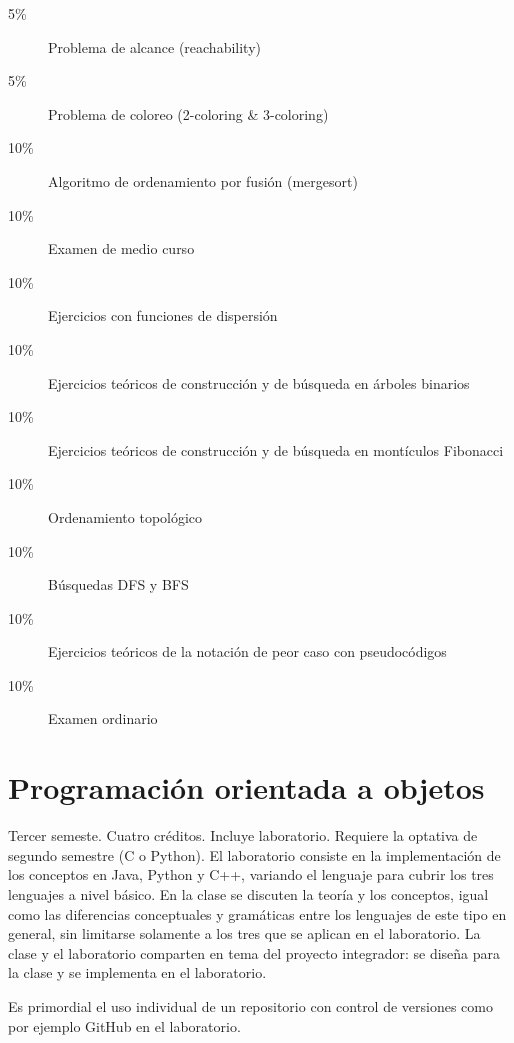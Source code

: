\documentclass{article}
\begin{document}
\begin{multicols}{4}
\begin{description}
\item[5\%]{Problema de alcance (reachability)}
\item[5\%]{Problema de coloreo (2-coloring \& 3-coloring)}
\item[10\%]{Algoritmo de ordenamiento por fusi\'{o}n (mergesort)}
\item[10\%]{Examen de medio curso}
\item[10\%]{Ejercicios con funciones de dispersi\'{o}n}
\item[10\%]{Ejercicios te\'{o}ricos de construcci\'{o}n y de
  b\'{u}squeda en \'{a}rboles binarios}
\item[10\%]{Ejercicios te\'{o}ricos de construcci\'{o}n y de
  b\'{u}squeda en mont\'{i}culos Fibonacci}
\item[10\%]{Ordenamiento topol\'{o}gico}
\item[10\%]{B\'{u}squedas DFS y BFS}
\item[10\%]{Ejercicios te\'{o}ricos de la notaci\'{o}n de peor caso
  con pseudoc\'{o}digos}
\item[10\%]{Examen ordinario}
\end{description}

\vfill\null \columnbreak

\hypertarget{poao}{\section*{Programaci\'{o}n orientada a objetos}}

Tercer semeste. Cuatro cr\'{e}ditos. Incluye laboratorio. Requiere la
optativa de segundo semestre (C o Python). El laboratorio consiste en
la implementaci\'{o}n de los conceptos en Java, Python y C++, variando el
lenguaje para cubrir los tres lenguajes a nivel b\'{a}sico. En la clase se
discuten la teor\'{i}a y los conceptos, igual como las diferencias
conceptuales y gram\'{a}ticas entre los lenguajes de este tipo en general,
sin limitarse solamente a los tres que se aplican en el
laboratorio. La clase y el laboratorio comparten en tema del proyecto
integrador: se dise\~{n}a para la clase y se implementa en el laboratorio.

Es primordial el uso individual de un repositorio con control de
versiones como por ejemplo GitHub en el laboratorio.


\end{multicols}
\end{document}
